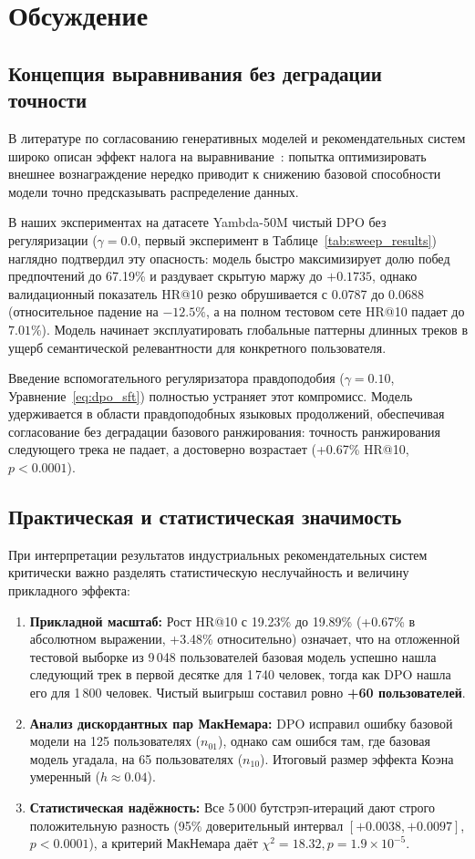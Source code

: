 \section{Обсуждение}
\label{sec:discussion}

\subsection{Концепция выравнивания без деградации точности}
В литературе по согласованию генеративных моделей и рекомендательных систем широко описан эффект налога на выравнивание~\cite{petrov2024aligning}: попытка оптимизировать внешнее вознаграждение нередко приводит к снижению базовой способности модели точно предсказывать распределение данных.

В наших экспериментах на датасете Yambda-50M чистый DPO без регуляризации ($\gamma=0.0$, первый эксперимент в Таблице~\ref{tab:sweep_results}) наглядно подтвердил эту опасность: модель быстро максимизирует долю побед предпочтений до 67.19\% и раздувает скрытую маржу до $+0.1735$, однако валидационный показатель HR@10 резко обрушивается с 0.0787 до 0.0688 (относительное падение на $-12.5\%$, а на полном тестовом сете HR@10 падает до $7.01\%$). Модель начинает эксплуатировать глобальные паттерны длинных треков в ущерб семантической релевантности для конкретного пользователя.

Введение вспомогательного регуляризатора правдоподобия ($\gamma=0.10$, Уравнение~\ref{eq:dpo_sft}) полностью устраняет этот компромисс. Модель удерживается в области правдоподобных языковых продолжений, обеспечивая согласование без деградации базового ранжирования: точность ранжирования следующего трека не падает, а достоверно возрастает (+0.67\% HR@10, $p < 0.0001$).

\subsection{Практическая и статистическая значимость}
При интерпретации результатов индустриальных рекомендательных систем критически важно разделять статистическую неслучайность и величину прикладного эффекта:
\begin{enumerate}
    \item \textbf{Прикладной масштаб:} Рост HR@10 с 19.23\% до 19.89\% (+0.67\% в абсолютном выражении, +3.48\% относительно) означает, что на отложенной тестовой выборке из 9\,048 пользователей базовая модель успешно нашла следующий трек в первой десятке для 1\,740 человек, тогда как DPO нашла его для 1\,800 человек. Чистый выигрыш составил ровно \textbf{+60 пользователей}.
    \item \textbf{Анализ дискордантных пар МакНемара:} DPO исправил ошибку базовой модели на 125 пользователях ($n_{01}$), однако сам ошибся там, где базовая модель угадала, на 65 пользователях ($n_{10}$). Итоговый размер эффекта Коэна умеренный ($h \approx 0.04$).
    \item \textbf{Статистическая надёжность:} Все 5\,000 бутстрэп-итераций дают строго положительную разность (95\% доверительный интервал $[+0.0038, +0.0097]$, $p < 0.0001$), а критерий МакНемара даёт $\chi^2 = 18.32, p = 1.9 \times 10^{-5}$.
\end{enumerate}

